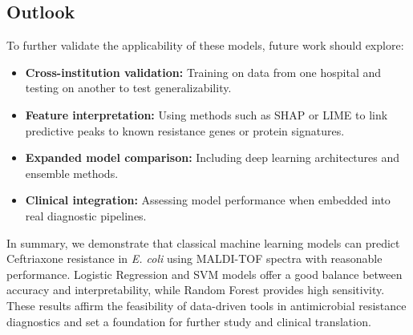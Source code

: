 \documentclass{article}
\begin{document}
\subsection*{Outlook}
To further validate the applicability of these models, future work should explore:
\begin{itemize}
    \item \textbf{Cross-institution validation:} Training on data from one hospital and testing on another to test generalizability.
    \item \textbf{Feature interpretation:} Using methods such as SHAP or LIME to link predictive peaks to known resistance genes or protein signatures.
    \item \textbf{Expanded model comparison:} Including deep learning architectures and ensemble methods.
    \item \textbf{Clinical integration:} Assessing model performance when embedded into real diagnostic pipelines.
\end{itemize}

In summary, we demonstrate that classical machine learning models can predict Ceftriaxone resistance in \textit{E. coli} using MALDI-TOF spectra with reasonable performance. Logistic Regression and SVM models offer a good balance between accuracy and interpretability, while Random Forest provides high sensitivity. These results affirm the feasibility of data-driven tools in antimicrobial resistance diagnostics and set a foundation for further study and clinical translation.





\end{document}
